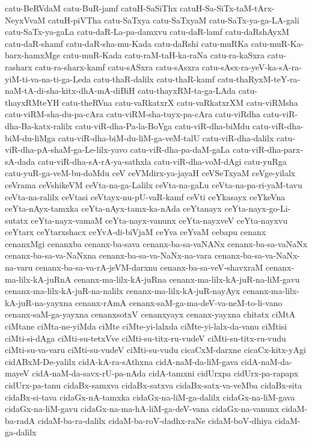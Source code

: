 {catu-BeRVdaM
catu-BuR-jamf
catuH-SaSiThx
catuH-Sa-SiTx-taM-tArx-NeyxVvaM
catuH-piVTha
catu-SaTxya
catu-SaTxyaM
catu-SaTx-ya-ga-LA-gali
catu-SaTx-ya-gaLa
catu-daR-La-pa-damxvu
catu-daR-lamf
catu-daRshAyxM
catu-daR-shamf
catu-daR-sha-mu-Kada
catu-daRshi
catu-muRKa
catu-muR-Ka-barx-hamxMge
catu-muR-Kada
catu-raM-taH-ka-raNa
catu-ra-kaSxra
catu-rasharx
catu-ra-sharx-kamf
catu-sASxra
catu-sAsxra
catu-sAsx-ra-yeV-ka-sA-ra-yiM-ti-va-na-ti-ga-Leda
catu-thaR-dalilx
catu-thaR-kamf
catu-thaRyxM-teY-ra-naM-tA-di-sha-kitx-dhA-mA-diBiH
catu-thayxRM-ta-ga-LAda
catu-thayxRMteYH
catu-theRVna
catu-vaRkatxrX
catu-vaRkatxrXM
catu-viRMsha
catu-viRM-sha-du-pa-cAra
catu-viRM-sha-tuyx-pa-cAra
catu-viRdha
catu-viR-dha-Ba-katx-ralilx
catu-viR-dha-Pa-la-BoVga
catu-viR-dha-biMdu
catu-viR-dha-biM-du-liMga
catu-viR-dha-biM-du-liM-ga-veM-talU
catu-viR-dha-dalilx
catu-viR-dha-pA-shaM-ga-Le-lilx-yavo
catu-viR-dha-pa-daM-gaLa
catu-viR-dha-parx-sA-dada
catu-viR-dha-sA-rA-ya-sathxla
catu-viR-dha-voM-dAgi
catu-yuRga
catu-yuR-ga-veM-bu-doMdu
ceV
ceVMdirx-ya-jayaH
ceVSeTxyaM
ceVge-yilalx
ceVrama
ceVshikeVM
ceVta-na-ga-Lalilx
ceVta-na-gaLu
ceVta-na-pa-ri-yaM-tavu
ceVta-na-ralilx
ceVtasi
ceVtayx-nu-pU-vaR-kamf
ceVti
ceYkasayx
ceYkeVna
ceYta-nAyx-tamxka
ceYta-nAyx-tamx-ka-nAda
ceYtanayx
ceYta-nayx-go-Li-sutatx
ceYta-nayx-vamaM
ceYta-nayx-vanunx
ceYta-nayxveV
ceYta-nayxvu
ceYtarx
ceYtarxshacx
ceYvA-di-biVjaM
ceYva
ceYvaM
cebapu
cenanx
cenanxMgi
cenanxba
cenanx-ba-sava
cenanx-ba-sa-vaNANx
cenanx-ba-sa-vaNaNx
cenanx-ba-sa-va-NaNxna
cenanx-ba-sa-va-NaNx-na-vara
cenanx-ba-sa-va-NaNx-na-varu
cenanx-ba-sa-va-rA-jeVM-darxnu
cenanx-ba-sa-veV-shavxraM
cenanx-ma-lilx-kA-juRnA
cenanx-ma-lilx-kA-juRna
cenanx-ma-lilx-kA-juR-na-liM-gavu
cenanx-ma-lilx-kA-juR-na-nalilx
cenanx-ma-lilx-kA-juR-nayAyx
cenanx-ma-lilx-kA-juR-na-yayxna
cenanx-rAmA
cenanx-saM-ga-ma-deV-va-neM-to-li-vano
cenanx-saM-ga-yayxna
cenanxsotxV
cenanxyayx
cenanx-yayxna
chitatx
ciMtA
ciMtane
ciMta-ne-yiMda
ciMte
ciMte-yi-lalxda
ciMte-yi-lalx-da-vanu
ciMtisi
ciMti-si-dAga
ciMti-su-tetxVve
ciMti-su-titx-ru-vudeV
ciMti-su-titx-ru-vudu
ciMti-su-va-varu
ciMti-su-vudeV
ciMti-su-vudu
cicaCxM-darxne
cicaCx-kitx-yAgi
cidABxM-De-yalilx
cidA-kA-ra-sAthxna
cidA-naM-da-liM-gava
cidA-naM-da-mayeV
cidA-naM-da-savx-rU-pa-nAda
cidA-tamxni
cidUrxpa
cidUrx-pa-rapapx
cidUrx-pa-tanu
cidaBx-samxva
cidaBx-satxva
cidaBx-satx-va-veMba
cidaBx-sita
cidaBx-si-tava
cidaGx-nA-tamxka
cidaGx-na-liM-ga-dalilx
cidaGx-na-liM-gava
cidaGx-na-liM-gavu
cidaGx-na-ma-hA-liM-ga-deV-vana
cidaGx-na-vanunx
cidaM-ba-radA
cidaM-ba-ra-dalilx
cidaM-ba-roV-dadhx-raNe
cidaM-boV-dhiya
cidaM-ga-dalilx
}
